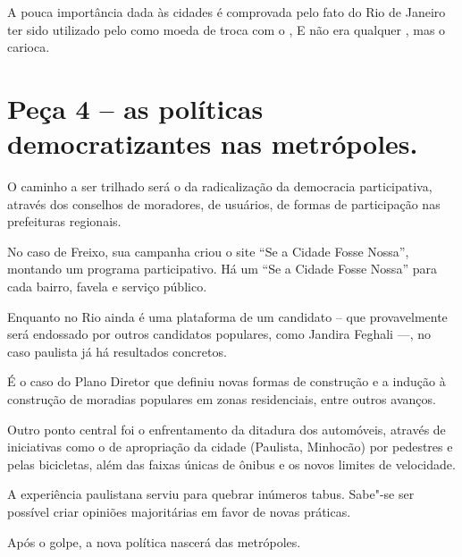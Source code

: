 A pouca importância dada às cidades é comprovada pelo fato do Rio de
Janeiro ter sido utilizado pelo  como moeda de troca com o , E não
era qualquer , mas o  carioca.

\section{Peça 4 -- as políticas democratizantes nas metrópoles.}

O caminho a ser trilhado será o da radicalização da democracia
participativa, através dos conselhos de moradores, de usuários, de
formas de participação nas prefeituras regionais.

No caso de Freixo, sua campanha criou o site ``Se a Cidade Fosse
Nossa'', montando um programa participativo. Há um ``Se a Cidade Fosse
Nossa'' para cada bairro, favela e serviço público.

Enquanto no Rio ainda é uma plataforma de um candidato -- que
provavelmente será endossado por outros candidatos populares, como
Jandira Feghali \mbox{---,} no caso paulista já há resultados concretos.

É o caso do Plano Diretor que definiu novas formas de construção e a
indução à construção de moradias populares em zonas residenciais, entre
outros avanços.

Outro ponto central foi o enfrentamento da ditadura dos automóveis,
através de iniciativas como o de apropriação da cidade (Paulista,
Minhocão) por pedestres e pelas bicicletas, além das faixas únicas de
ônibus e os novos limites de velocidade.

A experiência paulistana serviu para quebrar inúmeros tabus. Sabe"-se ser
possível criar opiniões majoritárias em favor de novas práticas.

Após o golpe, a nova política nascerá das metrópoles.
